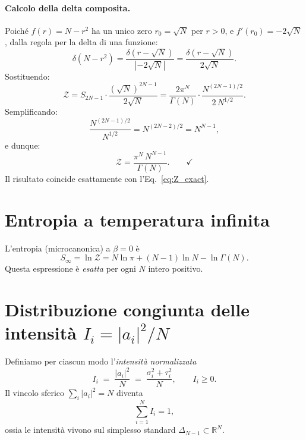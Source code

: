 \documentclass[a4paper,11pt]{article}
\begin{document}
\paragraph{Calcolo della delta composita.}
Poiché $f(r) = N - r^2$ ha un unico zero $r_0 = \sqrt{N}$ per $r > 0$,
e $f'(r_0) = -2\sqrt{N}$, dalla regola per la delta di una funzione:
\begin{equation}
  \delta(N - r^2) = \frac{\delta(r - \sqrt{N})}{|{-2\sqrt{N}}|}
                  = \frac{\delta(r - \sqrt{N})}{2\sqrt{N}} .
\end{equation}
Sostituendo:
\begin{equation}
  \mathcal{Z}
  = S_{2N-1} \cdot
    \frac{(\sqrt{N})^{2N-1}}{2\sqrt{N}}
  = \frac{2\pi^N}{\Gamma(N)} \cdot
    \frac{N^{(2N-1)/2}}{2\,N^{1/2}} .
\end{equation}
Semplificando:
\begin{equation}
  \frac{N^{(2N-1)/2}}{N^{1/2}} = N^{(2N-2)/2} = N^{N-1} ,
\end{equation}
e dunque:
\begin{equation}
  \mathcal{Z}
  = \frac{\pi^N\, N^{N-1}}{\Gamma(N)} . \qquad \checkmark
\end{equation}
Il risultato coincide esattamente con l'Eq.~\eqref{eq:Z_exact}.

\section{Entropia a temperatura infinita}

L'entropia (microcanonica) a $\beta = 0$ è
\begin{equation}\label{eq:entropy}
  \boxed{
  S_\infty
  = \ln \mathcal{Z}
  = N \ln\pi + (N-1)\ln N - \ln\Gamma(N) .
  }
\end{equation}
Questa espressione è \emph{esatta} per ogni $N$ intero positivo.

\section{Distribuzione congiunta delle intensità $I_i = |a_i|^2/N$}

Definiamo per ciascun modo l'\emph{intensità normalizzata}
\begin{equation}\label{eq:Ii_def}
  I_i \;=\; \frac{|a_i|^2}{N} \;=\; \frac{\sigma_i^2 + \tau_i^2}{N} ,
  \qquad I_i \geq 0 .
\end{equation}
Il vincolo sferico $\sum_i |a_i|^2 = N$ diventa
\begin{equation}\label{eq:simplex}
  \sum_{i=1}^{N} I_i = 1 ,
\end{equation}
ossia le intensità vivono sul simplesso standard
$\Delta_{N-1} \subset \mathbb{R}^N$.
\end{document}
